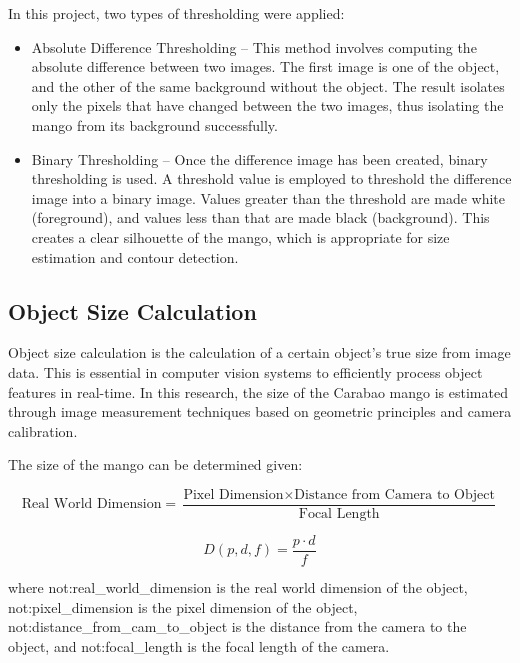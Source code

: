 In this project, two types of thresholding were applied:
\begin{itemize}

    \item Absolute Difference Thresholding – This method involves computing the absolute difference between two images. The first image is one of the object, and the other of the same background without the object. The result isolates only the pixels that have changed between the two images, thus isolating the mango from its background successfully.
    \item Binary Thresholding – Once the difference image has been created, binary thresholding is used. A threshold value is employed to threshold the difference image into a binary image. Values greater than the threshold are made white (foreground), and values less than that are made black (background). This creates a clear silhouette of the mango, which is appropriate for size estimation and contour detection.

\end{itemize}

\subsection{Object Size Calculation}

Object size calculation is the calculation of a certain object's true size from
image data. This is essential in computer vision systems to efficiently process
object features in real-time. In this research, the size of the Carabao mango is
estimated through image measurement techniques based on geometric principles and
camera calibration.

The size of the mango can be determined given:

\begin{equation}
	\label{eq:objectSizeCalculation}
	\text{Real World Dimension} = \frac{\text{Pixel Dimension} \times \text{Distance from Camera to Object}}{\text{Focal Length}}
\end{equation}

\begin{equation} \label{eq:objectSizeCalculation2}
	\ensuremath{D \left( p, d, f \right)= \frac{p \cdot d}{f} }
\end{equation}

where \gls{not:real_world_dimension} is the real world dimension of the object,
 \gls{not:pixel_dimension} is the pixel dimension of the object, 
 \gls{not:distance_from_cam_to_object} is the distance from the camera to the object,
  and \gls{not:focal_length} is the focal length of the camera.

